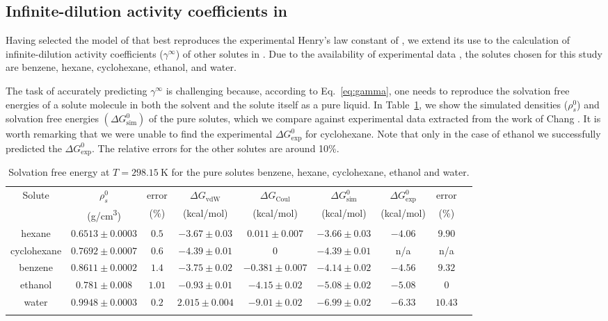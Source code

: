 \documentclass[3p,twocolumn]{elsarticle}
\begin{document}
\subsection{Infinite-dilution activity coefficients in \ce{[emim][B(CN)_4]}}
\label{sec:act_results}

Having selected the model of \ce{[emim][B(CN)_4]} that best reproduces the experimental Henry's law constant of , we extend its use to the calculation of infinite-dilution activity coefficients ($\gamma^\infty$) of other solutes in \ce{[emim][B(CN)_4]}.
Due to the availability of experimental data \cite{Yan_2010, Doma_ska_2011}, the solutes chosen for this study are benzene, hexane, cyclohexane, ethanol, and water.

The task of accurately predicting $\gamma^\infty$ is challenging because, according to Eq.~\eqref{eq:gamma}, one needs to reproduce the solvation free energies of a solute molecule in both the solvent and the solute itself as a pure liquid.
In Table~\ref{table:mu_solutes}, we show the simulated densities ($\rho^0_s$) and solvation free energies $(\Delta G^{0}_\text{sim})$ of the pure solutes, which we compare against experimental data extracted from the work of Chang \cite{Chang_2009}.
It is worth remarking that we were unable to find the experimental $\Delta G^{0}_\text{exp}$ for cyclohexane.
Note that only in the case of ethanol we successfully predicted the $\Delta G^{0}_\text{exp}$.
The relative errors for the other solutes are around 10\%.

\begin{table}
	\centering
	\caption{Solvation free energy at $T = 298.15~\text{K}$ for the pure solutes benzene, hexane, cyclohexane, ethanol and water.}
	\begin{adjustbox}{max width=\textwidth}
		\begin{tabular}{ccccccccc}
			\hline\hline
			Solute & $\rho^0_s$ & error & $\Delta G_\text{vdW}$  & $\Delta G_\text{Coul}$  & $\Delta G^0_\text{sim}$ & $\Delta G^0_\text{exp}$   & error \\
			& (g/cm\textsuperscript{3}) & (\%) & (kcal/mol) &  (kcal/mol) &  (kcal/mol)   & (kcal/mol)   & (\%) \\
			\hline
			hexane & $0.6513 \pm 0.0003$ & $0.5$ & $-3.67  \pm  0.03$ & $0.011 \pm 0.007$ & $-3.66 \pm 0.03$ & $-4.06$ & $9.90$ \\
			cyclohexane & $0.7692 \pm 0.0007$ & $0.6$ & $-4.39 \pm 0.01$ & $0$ & $-4.39 \pm 0.01$ & n/a & n/a  \\
			benzene & $0.8611 \pm 0.0002$ & $1.4$ & $-3.75  \pm 0.02$ & $-0.381 \pm 0.007$ & $-4.14 \pm 0.02$ & $-4.56$ & $9.32$  \\
			ethanol & $0.781 \pm 0.008$ & $1.01$  & $-0.93 \pm 0.01$ & $-4.15 \pm 0.02$  & $-5.08  \pm 0.02$  & $-5.08$ & $0$ \\
			water & $0.9948 \pm 0.0003$ & $0.2$ & $2.015 \pm 0.004$ & $-9.01 \pm 0.02$ & $-6.99 \pm 0.02$ & $-6.33$  & $10.43$ \\
			\hline\hline
			\label{table:mu_solutes} 
		\end{tabular}
	\end{adjustbox}
\end{table}
\end{document}
